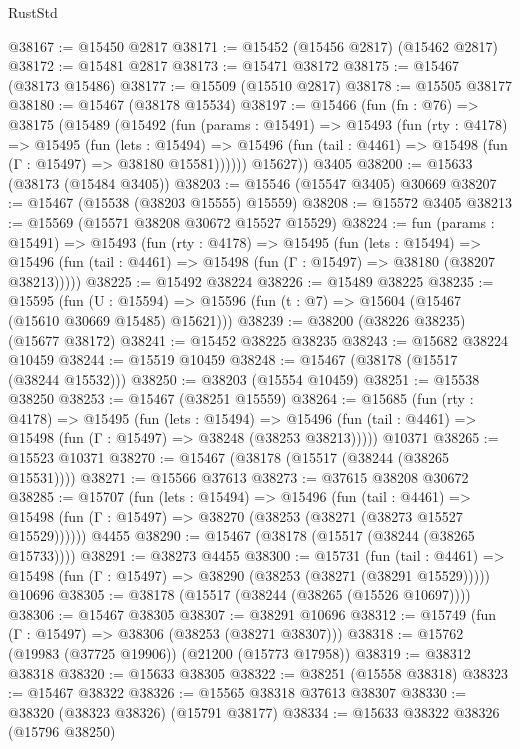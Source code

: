 \begin{lexlean}{RustStd}
\begin{coremodule}
@38167 := @15450 @2817
@38171 := @15452 (@15456 @2817) (@15462 @2817)
@38172 := @15481 @2817
@38173 := @15471 @38172
@38175 := @15467 (@38173 @15486)
@38177 := @15509 (@15510 @2817)
@38178 := @15505 @38177
@38180 := @15467 (@38178 @15534)
@38197 := @15466
    (fun (fn : @76) =>
    @38175
      (@15489
        (@15492
          (fun (params : @15491) =>
          @15493
            (fun (rty : @4178) =>
            @15495
              (fun (lets : @15494) =>
              @15496 (fun (tail : @4461) => @15498 (fun (Γ : @15497) => @38180 @15581))))))
        @15627))
    @3405
@38200 := @15633 (@38173 (@15484 @3405))
@38203 := @15546 (@15547 @3405) @30669
@38207 := @15467 (@15538 (@38203 @15555) @15559)
@38208 := @15572 @3405
@38213 := @15569 (@15571 @38208 @30672 @15527 @15529)
@38224 := fun (params : @15491) =>
  @15493
    (fun (rty : @4178) =>
    @15495
      (fun (lets : @15494) =>
      @15496 (fun (tail : @4461) => @15498 (fun (Γ : @15497) => @38180 (@38207 @38213)))))
@38225 := @15492 @38224
@38226 := @15489 @38225
@38235 := @15595
    (fun (U : @15594) => @15596 (fun (t : @7) => @15604 (@15467 (@15610 @30669 @15485) @15621)))
@38239 := @38200 (@38226 @38235) (@15677 @38172)
@38241 := @15452 @38225 @38235
@38243 := @15682 @38224 @10459
@38244 := @15519 @10459
@38248 := @15467 (@38178 (@15517 (@38244 @15532)))
@38250 := @38203 (@15554 @10459)
@38251 := @15538 @38250
@38253 := @15467 (@38251 @15559)
@38264 := @15685
    (fun (rty : @4178) =>
    @15495
      (fun (lets : @15494) =>
      @15496 (fun (tail : @4461) => @15498 (fun (Γ : @15497) => @38248 (@38253 @38213)))))
    @10371
@38265 := @15523 @10371
@38270 := @15467 (@38178 (@15517 (@38244 (@38265 @15531))))
@38271 := @15566 @37613
@38273 := @37615 @38208 @30672
@38285 := @15707
    (fun (lets : @15494) =>
    @15496
      (fun (tail : @4461) =>
      @15498 (fun (Γ : @15497) => @38270 (@38253 (@38271 (@38273 @15527 @15529))))))
    @4455
@38290 := @15467 (@38178 (@15517 (@38244 (@38265 @15733))))
@38291 := @38273 @4455
@38300 := @15731
    (fun (tail : @4461) => @15498 (fun (Γ : @15497) => @38290 (@38253 (@38271 (@38291 @15529)))))
    @10696
@38305 := @38178 (@15517 (@38244 (@38265 (@15526 @10697))))
@38306 := @15467 @38305
@38307 := @38291 @10696
@38312 := @15749 (fun (Γ : @15497) => @38306 (@38253 (@38271 @38307)))
@38318 := @15762 (@19983 (@37725 @19906)) (@21200 (@15773 @17958))
@38319 := @38312 @38318
@38320 := @15633 @38305
@38322 := @38251 (@15558 @38318)
@38323 := @15467 @38322
@38326 := @15565 @38318 @37613 @38307
@38330 := @38320 (@38323 @38326) (@15791 @38177)
@38334 := @15633 @38322 @38326 (@15796 @38250)

\end{coremodule}
\end{lexlean}
